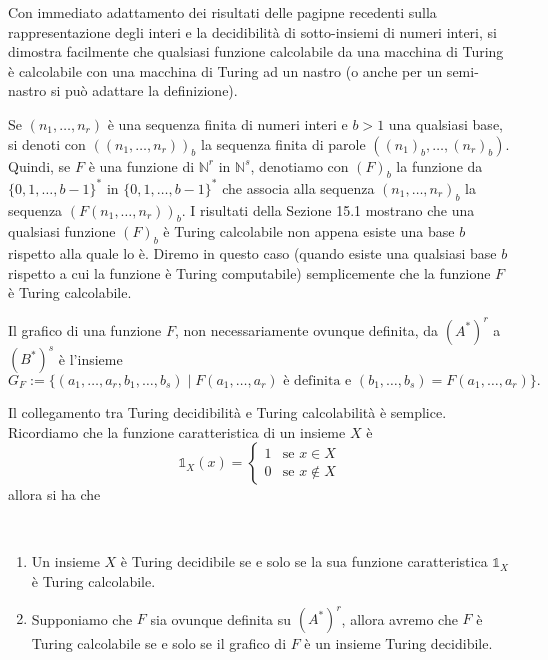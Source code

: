 Con immediato adattamento dei risultati delle pagipne recedenti sulla rappresentazione degli interi e la decidibilità di sotto-insiemi di numeri interi, si dimostra facilmente che qualsiasi funzione calcolabile da una macchina di Turing è calcolabile con una macchina di Turing ad un nastro (o anche per un semi-nastro si può adattare la definizione).

Se $(n_1,\dots,n_r)$ è una sequenza finita di numeri interi e $b>1$ una qualsiasi base, si denoti con $((n_1,\dots,n_r))_b$ la sequenza finita di parole $((n_1)_b,\dots,(n_r)_b)$. Quindi, se $F$ è una funzione di $\mathbb N^r$ in $\mathbb N^s$, denotiamo con $(F)_b$ la funzione da $\{0,1,\dots,b-1\}^*$ in $\{0,1,\dots,b-1\}^*$ che associa alla sequenza $(n_1,\dots,n_r)_b$ la sequenza $(F(n_1,\dots,n_r))_b$. I risultati della Sezione 15.1 mostrano che una qualsiasi funzione $(F)_b$ è Turing calcolabile non appena esiste una base $b$ rispetto alla quale lo è. Diremo in questo caso (quando esiste una qualsiasi base $b$ rispetto a cui la funzione è Turing computabile) semplicemente che la funzione $F$ è Turing calcolabile.

\begin{defi}
Il grafico di una funzione $F$, non necessariamente ovunque definita, da $(A^*)^r$ a $(B^*)^s$ è l'insieme
\[
G_F:=\{(a_1,\dots,a_r,b_1,\dots,b_s)\mid F(a_1,\dots,a_r)\text{ è definita e }(b_1,\dots,b_s)=F(a_1,\dots,a_r)\}.
\]
\end{defi}

Il collegamento tra Turing decidibilità e Turing calcolabilità è semplice. Ricordiamo che la funzione caratteristica di un insieme $X$ è
\[
\mathbb 1_X(x)=\begin{cases}1 & \text{se } x\in X\\ 0 & \text{se } x\notin X\end{cases}
\]
allora si ha che

\begin{prop}\
\begin{enumerate}
    \item[i)] Un insieme $X$ è Turing decidibile se e solo se la sua funzione caratteristica $\mathbb 1_X$ è Turing calcolabile.
    \item[ii)] Supponiamo che $F$ sia ovunque definita su $(A^*)^r$, allora avremo che $F$ è Turing calcolabile se e solo se il grafico di $F$ è un insieme Turing decidibile.
\end{enumerate}
\end{prop}

